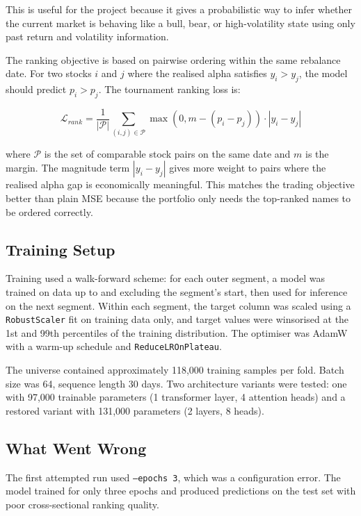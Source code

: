 \documentclass[conference]{IEEEtran}
\begin{document}
This is useful for the project because it gives a probabilistic way to infer whether the current market is behaving like a bull, bear, or high-volatility state using only past return and volatility information.

The ranking objective is based on pairwise ordering within the same rebalance date. For two stocks $i$ and $j$ where the realised alpha satisfies $y_i > y_j$, the model should predict $p_i > p_j$. The tournament ranking loss is:

\[
\mathcal{L}_{rank}
=
\frac{1}{|\mathcal{P}|}
\sum_{(i,j)\in \mathcal{P}}
\max\left(0, m - (p_i-p_j)\right)
\cdot |y_i-y_j|
\]

where $\mathcal{P}$ is the set of comparable stock pairs on the same date and $m$ is the margin. The magnitude term $|y_i-y_j|$ gives more weight to pairs where the realised alpha gap is economically meaningful. This matches the trading objective better than plain MSE because the portfolio only needs the top-ranked names to be ordered correctly.

\subsection{Training Setup}

Training used a walk-forward scheme: for each outer segment, a model was trained on data up to and excluding the segment's start, then used for inference on the next segment. Within each segment, the target column was scaled using a \texttt{RobustScaler} fit on training data only, and target values were winsorised at the 1st and 99th percentiles of the training distribution. The optimiser was AdamW with a warm-up schedule and \texttt{ReduceLROnPlateau}.

The universe contained approximately 118{,}000 training samples per fold. Batch size was 64, sequence length 30 days. Two architecture variants were tested: one with 97{,}000 trainable parameters (1 transformer layer, 4 attention heads) and a restored variant with 131{,}000 parameters (2 layers, 8 heads).

\subsection{What Went Wrong}

The first attempted run used \texttt{--epochs 3}, which was a configuration error. The model trained for only three epochs and produced predictions on the test set with poor cross-sectional ranking quality.
\end{document}
